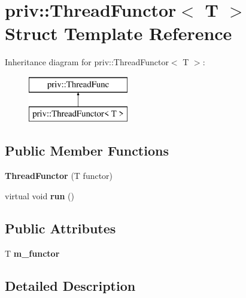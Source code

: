 \hypertarget{structpriv_1_1ThreadFunctor}{\section{priv\-:\-:Thread\-Functor$<$ T $>$ Struct Template Reference}
\label{structpriv_1_1ThreadFunctor}
}
Inheritance diagram for priv\-:\-:Thread\-Functor$<$ T $>$\-:\begin{figure}[H]
\begin{center}
\leavevmode
\includegraphics[height=2.000000cm]{structpriv_1_1ThreadFunctor}
\end{center}
\end{figure}
\subsection*{Public Member Functions}
\begin{DoxyCompactItemize}
\item 
\hypertarget{structpriv_1_1ThreadFunctor_a2df57df5cd6f7396b033512bb0e01848}{{\bfseries Thread\-Functor} (T functor)}\label{structpriv_1_1ThreadFunctor_a2df57df5cd6f7396b033512bb0e01848}

\item 
\hypertarget{structpriv_1_1ThreadFunctor_a8bb44b4b46d08d844d070ae3fdb251d7}{virtual void {\bfseries run} ()}\label{structpriv_1_1ThreadFunctor_a8bb44b4b46d08d844d070ae3fdb251d7}

\end{DoxyCompactItemize}
\subsection*{Public Attributes}
\begin{DoxyCompactItemize}
\item 
\hypertarget{structpriv_1_1ThreadFunctor_a73254bbde4d3452de1aeda531ca632b2}{T {\bfseries m\-\_\-functor}}\label{structpriv_1_1ThreadFunctor_a73254bbde4d3452de1aeda531ca632b2}

\end{DoxyCompactItemize}


\subsection{Detailed Description}
